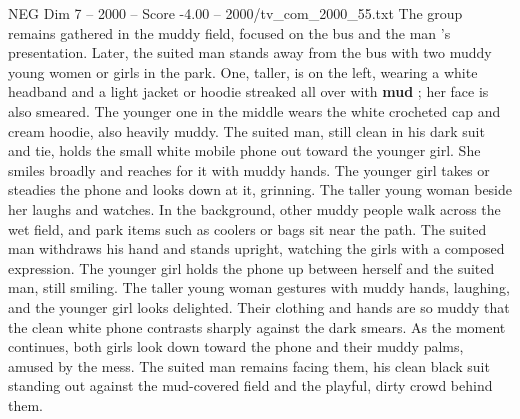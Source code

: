 \begin{textsample}{NEG Dim 7 – 2000 – Score -4.00 – 2000/tv\_com\_2000\_55.txt}
The group remains gathered in the muddy field, focused on the bus and the man ’s presentation.
Later, the suited man stands away from the bus with two muddy young women or girls in the park.
One, taller, is on the left, wearing a white headband and a light jacket or hoodie streaked all over with \textbf{mud} ; her face is also smeared.
The younger one in the middle wears the white crocheted cap and cream hoodie, also heavily muddy.
The suited man, still clean in his dark suit and tie, holds the small white mobile phone out toward the younger girl.
She smiles broadly and reaches for it with muddy hands.
The younger girl takes or steadies the phone and looks down at it, grinning.
The taller young woman beside her laughs and watches.
In the background, other muddy people walk across the wet field, and park items such as coolers or bags sit near the path.
The suited man withdraws his hand and stands upright, watching the girls with a composed expression.
The younger girl holds the phone up between herself and the suited man, still smiling.
The taller young woman gestures with muddy hands, laughing, and the younger girl looks delighted.
Their clothing and hands are so muddy that the clean white phone contrasts sharply against the dark smears.
As the moment continues, both girls look down toward the phone and their muddy palms, amused by the mess.
The suited man remains facing them, his clean black suit standing out against the mud-covered field and the playful, dirty crowd behind them.

\end{textsample}
